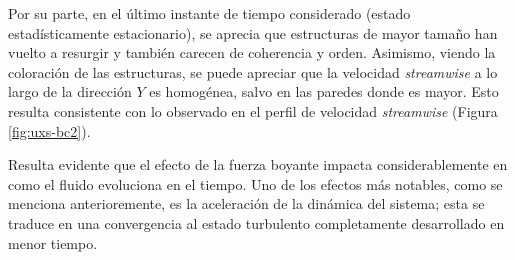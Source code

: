 Por su parte, en el último instante de tiempo considerado (estado estadísticamente estacionario), se aprecia que estructuras de mayor tamaño han vuelto a resurgir y también carecen de coherencia y orden. Asimismo, viendo la coloración de las estructuras, se puede apreciar que la velocidad \textit{streamwise} a lo largo de la dirección $Y$ es homogénea, salvo en las paredes donde es mayor. Esto resulta consistente con lo observado en el perfil de velocidad \textit{streamwise} (Figura \ref{fig:uxs-bc2}).

Resulta evidente que el efecto de la fuerza boyante impacta considerablemente en como el fluido evoluciona en el tiempo. Uno de los efectos más notables, como se menciona anterioremente, es la aceleración de la dinámica del sistema; esta se traduce en una convergencia al estado turbulento completamente desarrollado en menor tiempo.  


